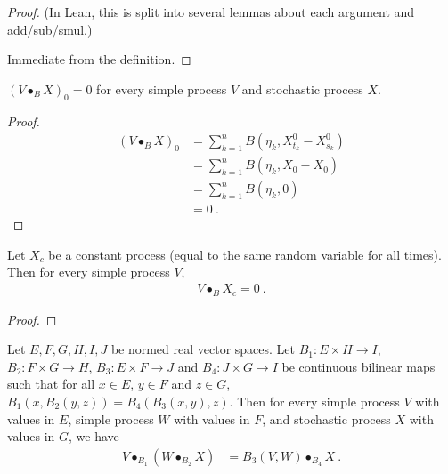 \begin{proof}
  \leanok
(In Lean, this is split into several lemmas about each argument and add/sub/smul.)

Immediate from the definition.
\end{proof}


\begin{lemma}\label{lem:elemStochIntegralBilin_zero}
  \leanok
$(V \bullet_B X)_0 = 0$ for every simple process $V$ and stochastic process $X$.
\end{lemma}

\begin{proof}
  \leanok
\begin{align*}
  (V \bullet_B X)_0
  &= \sum_{k=1}^{n} B (\eta_k, X^0_{t_k} - X^0_{s_k})
  \\
  &= \sum_{k=1}^{n} B (\eta_k, X_{0} - X_{0})
  \\
  &= \sum_{k=1}^{n} B (\eta_k, 0)
  \\
  &= 0
  \: .
\end{align*}
\end{proof}


\begin{lemma}\label{lem:elemStochIntegralBilin_const}
  \leanok
Let $X_c$ be a constant process (equal to the same random variable for all times).
Then for every simple process $V$,
\begin{align*}
  V \bullet_B X_c = 0
  \: .
\end{align*}
\end{lemma}

\begin{proof}
  \leanok
\end{proof}


\begin{lemma}\label{lem:elemStochIntegralBilin_assoc}
  \leanok
Let $E, F, G, H, I, J$ be normed real vector spaces.
Let $B_1 : E \times H \to I$, $B_2 : F \times G \to H$, $B_3 : E \times F \to J$ and $B_4 : J \times G \to I$ be continuous bilinear maps such that for all $x \in E$, $y \in F$ and $z \in G$, $B_1(x, B_2(y, z)) = B_4(B_3(x, y), z)$.
Then for every simple process $V$ with values in $E$, simple process $W$ with values in $F$, and stochastic process $X$ with values in $G$, we have
\begin{align*}
  V \bullet_{B_1} (W \bullet_{B_2} X)
  &= B_3(V, W) \bullet_{B_4} X
  \: .
\end{align*}
\end{lemma}

